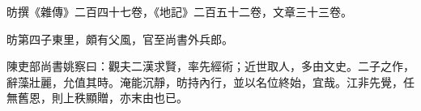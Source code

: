 \begin{pinyinscope}
 昉撰《雜傳》二百四十七卷，《地記》二百五十二卷，文章三十三卷。



 昉第四子東里，頗有父風，官至尚書外兵郎。



 陳吏部尚書姚察曰：觀夫二漢求賢，率先經術；近世取人，多由文史。二子之作，辭藻壯麗，允值其時。淹能沉靜，昉持內行，並以名位終始，宜哉。江非先覺，任無舊恩，則上秩顯贈，亦末由也已。



\end{pinyinscope}